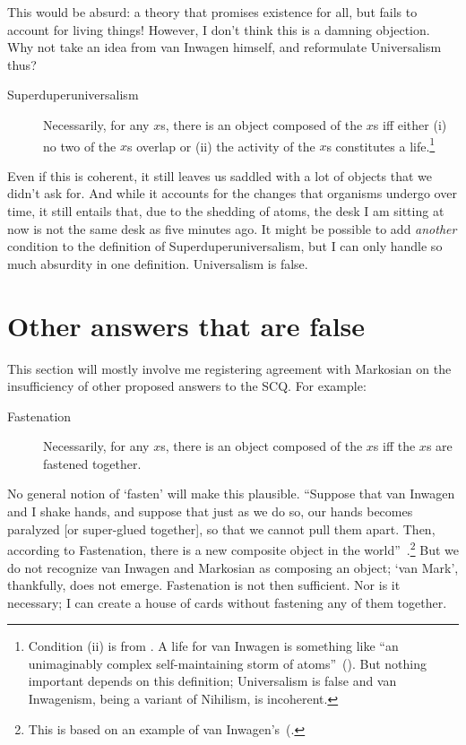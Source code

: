 \documentclass[11pt]{article}
\begin{document}
\begin{spacing}{1.5}
This would be absurd: a theory that promises existence for all, but fails to account for living things! However, I don't think this is a damning objection. Why not take an idea from van Inwagen himself, and reformulate Universalism thus?
\begin{description}
	\item[Superduperuniversalism] Necessarily, for any $x$s, there is an object composed of the $x$s iff either (i) no two of the $x$s overlap or (ii) the activity of the $x$s constitutes a life.\footnote{Condition (ii) is from \citet[82]{inwagen1995}. A life for van Inwagen is something like ``an unimaginably complex self-maintaining storm of atoms''~(\citeyear[87]{inwagen1995}). But nothing important depends on this definition; Universalism is false and van Inwagenism, being a variant of Nihilism, is incoherent.}
\end{description}
Even if this is coherent, it still leaves us saddled with a lot of objects that we didn't ask for. And while it accounts for the changes that organisms undergo over time, it still entails that, due to the shedding of atoms, the desk I am sitting at now is not the same desk as five minutes ago. It might be possible to add {\em another} condition to the definition of Superduperuniversalism, but I can only handle so much absurdity in one definition. Universalism is false.

\section{Other answers that are false}
This section will mostly involve me registering agreement with Markosian on the insufficiency of other proposed answers to the SCQ. For example:
\begin{description}
	\item[Fastenation] Necessarily, for any $x$s, there is an object composed of the $x$s iff the $x$s are fastened together.~\citep[223]{markosian1998a}
\end{description}
No general notion of `fasten' will make this plausible. ``Suppose that van Inwagen and I shake hands, and suppose that just as we do so, our hands becomes paralyzed [or super-glued together], so that we cannot pull them apart. Then, according to Fastenation, there is a new composite object in the world''~\citep[224]{markosian1998a}.\footnote{This is based on an example of van Inwagen's~(\citeyear[57--58]{inwagen1995}.} But we do not recognize van Inwagen and Markosian as composing an object; `van Mark', thankfully, does not emerge. Fastenation is not then sufficient. Nor is it necessary; I can create a house of cards without fastening any of them together.


\end{spacing}
\end{document}
